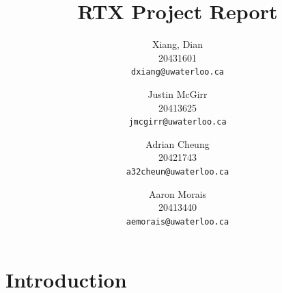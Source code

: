 \documentclass[12pt]{report}
\begin{document}

\title{RTX Project Report}

\author{
    Xiang, Dian\\
    20431601\\
    \texttt{dxiang@uwaterloo.ca}
    \and
    Justin McGirr\\
    20413625\\
    \texttt{jmcgirr@uwaterloo.ca}
    \and
    Adrian Cheung\\
    20421743\\
    \texttt{a32cheun@uwaterloo.ca}
    \and
    Aaron Morais\\
    20413440\\
    \texttt{aemorais@uwaterloo.ca}
}

\maketitle

\begin{abstract}
\end{abstract}

\tableofcontents
\listofalgorithms
\listoffigures



\part{Introduction}
\end{document}
